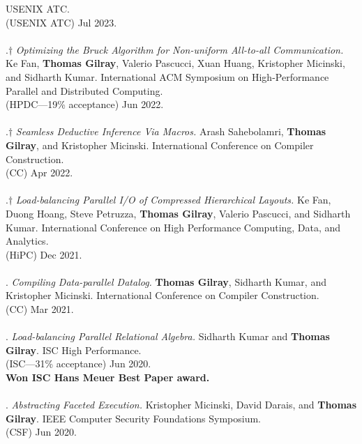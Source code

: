 USENIX ATC.
\\(USENIX ATC) Jul 2023. 
\\ \vspace{-0.1cm}\\
\paper.$\dagger$ \textit{Optimizing the Bruck Algorithm for Non-uniform All-to-all Communication.}
Ke Fan, \textbf{Thomas Gilray}, Valerio Pascucci, Xuan Huang, Kristopher Micinski, and Sidharth Kumar.
International ACM Symposium on High-Performance Parallel and Distributed Computing.
\\(HPDC---19\% acceptance) Jun 2022. 
\\ \vspace{-0.1cm}\\
\paper.$\dagger$ \textit{Seamless Deductive Inference Via Macros.}
Arash Sahebolamri, \textbf{Thomas Gilray}, and Kristopher Micinski.
International Conference on Compiler Construction.
\\(CC) Apr 2022. 
\\ \vspace{-0.1cm}\\
\paper.$\dagger$ \textit{Load-balancing Parallel I/O of Compressed Hierarchical Layouts.}
Ke Fan, Duong Hoang, Steve Petruzza, \textbf{Thomas Gilray}, Valerio Pascucci, and Sidharth Kumar.
International Conference on High Performance Computing, Data, and Analytics.
\\(HiPC) Dec 2021. 
\\ \vspace{-0.1cm}\\
\paper. \textit{Compiling Data-parallel Datalog.}
\textbf{Thomas Gilray}, Sidharth Kumar, and Kristopher Micinski.
International Conference on Compiler Construction.
\\(CC) Mar 2021. 
\\ \vspace{-0.1cm}\\
\paper. \textit{Load-balancing Parallel Relational Algebra.}
Sidharth Kumar and \textbf{Thomas Gilray}.
ISC High Performance.
\\(ISC---31\% acceptance) Jun 2020. 
\\\textbf{Won ISC Hans Meuer Best Paper award.} \\ \vspace{-0.1cm}\\
\paper. \textit{Abstracting Faceted Execution.}
Kristopher Micinski, David Darais, and \textbf{Thomas Gilray}.
IEEE Computer Security Foundations Symposium.
\\(CSF) Jun 2020. 
\\ \vspace{-0.1cm}\\
